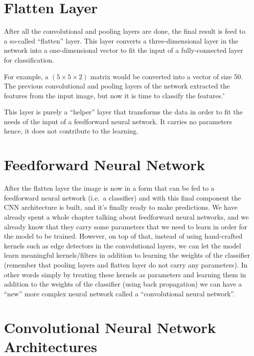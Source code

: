\section{Flatten Layer}

After all the convolutional and pooling layers are done, the final result is feed to a so-called ``flatten'' layer.
This layer converts a three-dimensional layer in the network into a one-dimensional vector to fit the input of a
fully-connected layer for classification.

\be
For example, a $(5 \times 5 \times 2)$ matrix would be converted into a vector of size 50. The previous convolutional
and pooling layers of the network extracted the features from the input image, but now it is time to classify the
features. \v

\ee

This layer is purely a ``helper'' layer that transforms the data in order to fit the needs of the input of a
feedforward neural network. It carries no parameters hence, it does not contribute to the learning.

\section{Feedforward Neural Network}

After the flatten layer the image is now in a form that can be fed to a feedforward neural network (i.e.\ a classifier)
and with this final component the CNN architecture is built, and it's finally ready to make predictions. We have
already spent a whole chapter talking about feedforward neural networks, and we already know that they carry some
parameters that we need to learn in order for the model to be trained. However, on top of that, instead of using
hand-crafted kernels such as edge detectors in the convolutional layers, we can let the model learn meaningful
kernels/filters in addition to learning the weights of the classifier (remember that pooling layers and flatten layer
do not carry any parameters). In other words simply by treating these kernels as parameters and learning them in
addition to the weights of the classifier (using back propagation) we can have a ``new'' more complex neural network
called a ``convolutional neural network''.

\section{Convolutional Neural Network Architectures}

